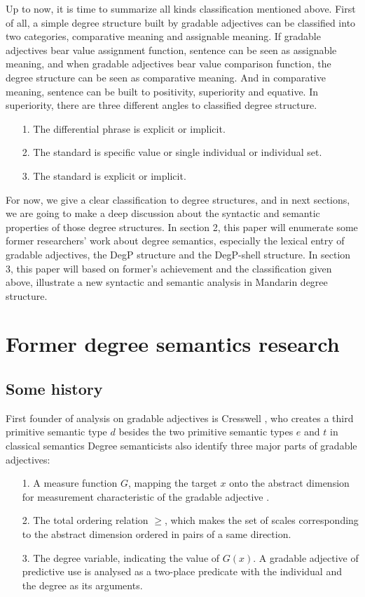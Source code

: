\documentclass{ctexart}
\let \cite \parencite
\begin{document}
Up to now, it is time to summarize all kinds classification mentioned above. First of all, a simple degree structure built by gradable adjectives can be classified into two categories, comparative meaning and assignable meaning. If gradable adjectives bear value assignment function, sentence can be seen as assignable meaning, and when gradable adjectives bear value comparison function, the degree structure can be seen as comparative meaning. And in comparative meaning, sentence can be built to positivity, superiority and equative. In superiority, there are three different angles to classified degree structure. 

\begin{itemize}
    \item[1.] The differential phrase is explicit or implicit.
    \item[2.] The standard is specific value or single individual or individual set.
    \item[3.] The standard is explicit or implicit.
\end{itemize}

For now, we give a clear classification to degree structures, and in next sections, we are going to make a deep discussion about the syntactic and semantic properties of those degree structures. In section 2, this paper will enumerate some former researchers' work about degree semantics, especially the lexical entry of gradable adjectives, the DegP structure and the DegP-shell structure. In section 3, this paper will based on former's achievement and the classification given above, illustrate a new syntactic and semantic analysis in Mandarin degree structure.

\section{Former degree semantics research}

\subsection{Some history}

First founder of analysis on gradable adjectives is Cresswell \cite{cresswell1976}, who creates a third primitive semantic type $d$ besides the two primitive semantic types $e$ and $t$ in classical semantics Degree semanticists also identify three major parts of gradable adjectives:

\begin{itemize}
    \item[1.] A measure function $G$, mapping the target $x$ onto the abstract dimension for measurement characteristic of the gradable adjective \cite{bartsch1974}.
    \item[2.] The total ordering relation $\geq$, which makes the set of scales corresponding to the abstract dimension ordered in pairs of a same direction.
    \item[3.] The degree variable, indicating the value of $G(x)$. A gradable adjective of predictive use is analysed as a two-place predicate with the individual and the degree as its arguments.
\end{itemize}
\end{document}
